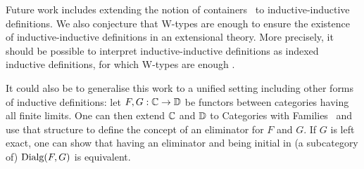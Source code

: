 \documentclass[orivec,envcountsame, ,envcountsect]{llncs}
\begin{document}
Future work includes extending the notion of
containers~\cite{abbottAltenkirchGhani2005containers} to
inductive-inductive definitions. We also conjecture that W-types are
enough to ensure the existence of inductive-inductive definitions in
an extensional theory. More precisely, it should be possible to
interpret inductive-inductive definitions as indexed inductive
definitions, for which W-types are enough
\cite{altenkirchMorris2009indexedCont}.

It could also be to generalise this work to a unified setting
including other forms of inductive definitions: let $F, G: \mathbb{C} \to \mathbb{D}$
be functors between categories having all finite limits. One can then
extend $\mathbb{C}$ and $\mathbb{D}$ to Categories with
Families~\cite{dybjer1996internalTT,hofmann1997syntaxsemantics} and
use that structure to define the concept of an eliminator for $F$ and
$G$. If $G$ is left exact, one can show that having an eliminator and
being initial in (a subcategory of) $\text{Dialg}(F, G)$ is equivalent.





\end{document}

